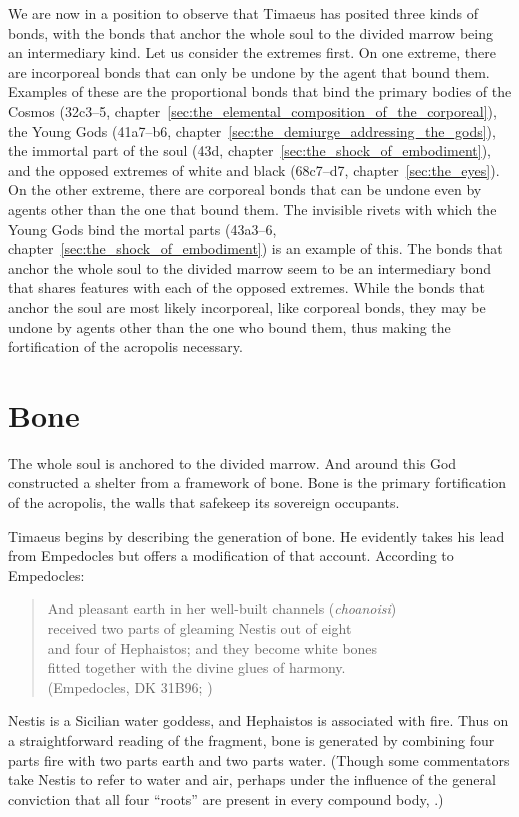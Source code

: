 We are now in a position to observe that Timaeus has posited three kinds of bonds, with the bonds that anchor the whole soul to the divided marrow being an intermediary kind. Let us consider the extremes first. On one extreme, there are incorporeal bonds that can only be undone by the agent that bound them. Examples of these are the proportional bonds that bind the primary bodies of the Cosmos  (32c3--5, chapter~\ref{sec:the_elemental_composition_of_the_corporeal}), the Young Gods (41a7--b6, chapter~\ref{sec:the_demiurge_addressing_the_gods}), the immortal part of the soul (43d, chapter~\ref{sec:the_shock_of_embodiment}), and the opposed extremes of white and black (68c7–d7, chapter~\ref{sec:the_eyes}). On the other extreme, there are corporeal bonds that can be undone even by agents other than the one that bound them. The invisible rivets with which the Young Gods bind the mortal parts (43a3–6, chapter~\ref{sec:the_shock_of_embodiment}) is an example of this. The bonds that anchor the whole soul to the divided marrow seem to be an intermediary bond that shares features with each of the opposed extremes. While the bonds that anchor the soul are most likely incorporeal, like corporeal bonds, they may be undone by agents other than the one who bound them, thus making the fortification of the acropolis necessary.


\section{Bone} %
\label{sec:bone}

The whole soul is anchored to the divided marrow. And around this God constructed a shelter from a framework of bone. Bone is the primary fortification of the acropolis, the walls that safekeep its sovereign occupants.

Timaeus begins by describing the generation of bone. He evidently takes his lead from Empedocles but offers a modification of that account. According to Empedocles:
\begin{verse}
	And pleasant earth in her well-built channels (\emph{choanoisi})\\
	received two parts of gleaming Nestis out of eight\\
	and four of Hephaistos; and they become white bones\\
	fitted together with the divine glues of harmony.\\
	(Empedocles, DK 31B96; \citealt[62 245]{Inwood:2001ve})
\end{verse}
Nestis is a Sicilian water goddess, and Hephaistos is associated with fire. Thus on a straightforward reading of the fragment, bone is generated by combining four parts fire with two parts earth and two parts water. (Though some commentators take Nestis to refer to water and air, perhaps under the influence of the general conviction that all four ``roots'' are present in every compound body, \citealt[209 n2]{Wright:1981zr}.) 

